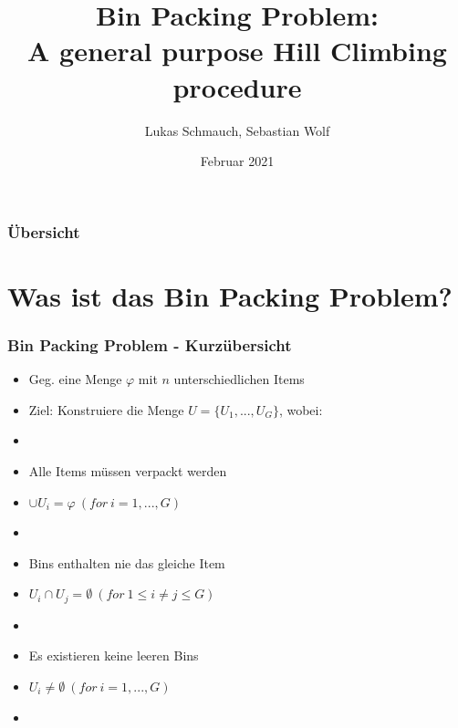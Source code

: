 \documentclass{beamer}
\title[BPP]{Bin Packing Problem:\\ A general purpose Hill Climbing procedure } %
\institute[FSU-Jena] %
{ 
Seminar Modern Heuristics \\
Dr. Rico Walter
}
\author{Lukas Schmauch, Sebastian Wolf}
\date{Februar 2021} %
\begin{document}
\begin{frame}
\titlepage %
\end{frame}
\begin{frame}
\frametitle{Übersicht} 
\tableofcontents
\end{frame}


\section{Was ist das Bin Packing Problem?} 
\begin{frame}
\frametitle{Bin Packing Problem - Kurzübersicht}
\begin{footnotesize}
\begin{itemize}
\item Geg. eine Menge $\varphi$ mit $n$ unterschiedlichen Items
\item Ziel: Konstruiere die Menge $U=\{U_1,...,U_G\}$, wobei:
\item[]
\item Alle Items müssen verpackt werden
\item[] $\cup U_i = \varphi \ (for \ i = 1,...,G)$
\item[]
\item Bins enthalten nie das gleiche Item
\item[] $U_i \cap U_j = \emptyset \ (for \ 1 \leq i\neq j \leq G )$
\item[]
\item Es existieren keine leeren Bins
\item[] $U_i\neq \emptyset \ (for \ i=1,...,G)$
\item[]
\end{itemize}
\end{footnotesize}
\end{frame}
\end{document}

